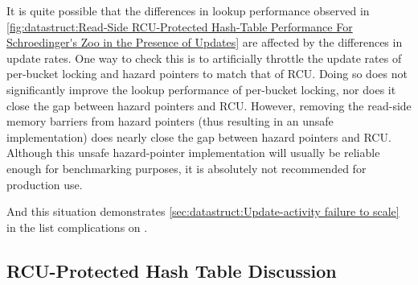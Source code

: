 It is quite possible that the differences in lookup performance observed in
\cref{fig:datastruct:Read-Side RCU-Protected Hash-Table Performance For Schroedinger's Zoo in the Presence of Updates}
are affected by the differences in update rates.
One way to check this is to artificially throttle the update rates of
per-bucket locking and hazard pointers to match that of RCU\@.
Doing so does not significantly improve the lookup performance of
per-bucket locking, nor does it close the gap between hazard pointers
and RCU\@.
However, removing the read-side memory barriers from hazard pointers
(thus resulting in an unsafe implementation) does nearly close the gap
between hazard pointers and RCU\@.
Although this unsafe hazard-pointer implementation will
usually be reliable enough for benchmarking purposes, it is absolutely
not recommended for production use.

\QuickQuizEnd

And this situation demonstrates
\cref{sec:datastruct:Update-activity failure to scale}
in the list complications on
.


\subsection{RCU-Protected Hash Table Discussion}
\label{sec:datastruct:RCU-Protected Hash Table Discussion}

